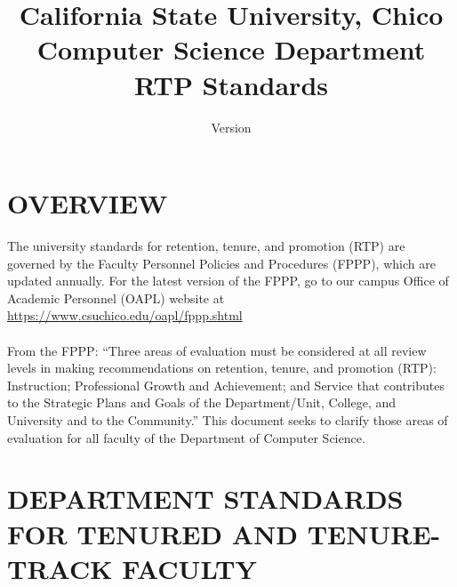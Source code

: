 \documentclass{scrartcl}
\title{California State University, Chico\\Computer Science Department\\RTP Standards}
\subtitle{Version \version}
\def\version{1.4}
\begin{document}
\fancyhead{}\fancyfoot{}
\begin{titlepage}
\clearpage\maketitle
\thispagestyle{empty}

\end{titlepage}



{
}
\fancyhead[R]{\fontsize{8}{12} \selectfont Revised: \today\\ v\version}

\setlength{\parindent}{0pt}

\tableofcontents

\pagebreak

\section{OVERVIEW}

The university standards for retention, tenure, and promotion (RTP) are governed by the Faculty Personnel Policies and Procedures (FPPP), which are updated annually. For the latest version of the FPPP, go to our campus Office of Academic Personnel (OAPL) website at \href{https://www.csuchico.edu/oapl/fppp.shtml}{https://www.csuchico.edu/oapl/fppp.shtml}
\\\\
From the FPPP: “Three areas of evaluation must be considered at all review levels in making recommendations on retention, tenure, and promotion (RTP): Instruction; Professional Growth and Achievement; and Service that contributes to the Strategic Plans and Goals of the Department/Unit, College, and University and to the Community.” This document seeks to clarify those areas of evaluation for all faculty of the Department of Computer Science.

 \thispagestyle{firststyle}

\section{DEPARTMENT STANDARDS FOR TENURED AND TENURE-TRACK FACULTY }
\end{document}
